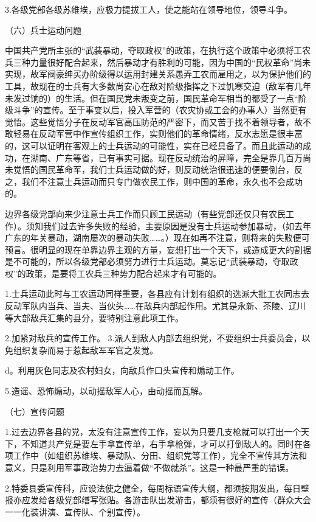 3.各级党部各级苏维埃，应极力提拔工人，使之能站在领导地位，领导斗争。

（六）兵士运动问题

中国共产党所主张的“武装暴动，夺取政权”的政策，在执行这个政策中必须将工农兵三种力量很好配合起来，然后暴动才有胜利的可能，因为中国的“民权革命”尚未实现，故军阀豪绅买办阶级得以运用封建关系愚弄工农而雇用之，以为保护他们的工具，故现在的士兵有大多数尚安心在敌对阶级指挥之下过饥寒交迫（敌军有几年未发过饷的）的生活。但在国民党未叛变之前，国民革命军相当的都受了一点“阶级斗争”的宣传。至于事变以后，投入军营的（农灾协或工会的办事人）当然更有觉悟。这些觉悟分子在反动军官高压防范的严密下，而又苦于找不着领导者，故不敢轻易在反动军营中作宣传组织工作，实则他们的革命情绪，反水志愿是很丰富的，这可以证明在客观上的士兵运动的可能性，实在已经具备了。而且此运动的成功，在湖南、广东等省，已有事实可据。现在反动统治的屏障，完全是靠几百万尚未觉悟的国民革命军，我们士兵运动做的好，则反动统治很迅速的便要倒台，反之，我们不注意士兵运动而只专门做农民工作，则中国的革命，永久也不会成功的。

边界各级党部向来少注意士兵工作而只顾工民运动（有些党部还仅只有农民工作）。须知我们过去许多失败的经验，主要原因是没有士兵运动参加暴动，（如去年广东的年关暴动，湖南屡次的暴动失败……。）现在如再不注意，则将来的失败便可预言。很明显的现在单靠边界主观的方量，妄想打出一个天下，或造成更大的割据是不可能的，所以各级党部必须努力进行士兵运动。莫忘记“武装暴动，夺取政权”的政策，是要将工农兵三种势力配合起来才有可能的。

1.士兵运动此时与工农运动同样重要，各县应有计划有组织的选派大批工农同志去反动军队内当兵、当夫、当伙头……在敌兵内部起作用。尤其是永新、茶陵、辽川等大部敌兵汇集的县分，要特别注意此项工作。

2.加紧对敌兵的宣传工作。 
3.派人到敌人内部去组织党，不要组织士兵委员会，以免组织复杂而易于惹起敌军军官之发觉。

d。利用灰色同志及农村妇女，向敌兵作口头宣传和煽动工作。

5.造谣、恐怖煽动，以动摇敌军人心，由动摇而瓦解。

（七）宣传问题

1.过去边界各县的党，太没有注意宣传工作，妄以为只要几支枪就可以打出一个天下，不知道共产党是要左手拿宣传单，右手拿枪弹，才可以打倒敌人的。同时在各项工作中（如组织苏维埃、暴动队、分田、组织党等工作），完全不宣传其方法和意义，只是利用军事政治势力去逼着做“不做就杀”。这是一种最严重的错误。

2.特委县委宣传科，应设法使之健全，每周标语宣传大纲，都须按期发出，每日壁报亦应发给各级党部缮写张贴。各游击队出发游击，都须有很好的宣传（群众大会一一化装讲演、宣传队、个别宣传）。

